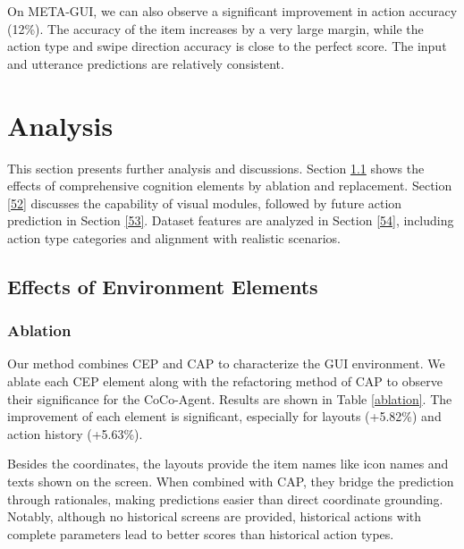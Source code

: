 On META-GUI, we can also observe a significant improvement in action accuracy (12\%).
The accuracy of the item increases by a very large margin, while the action type and swipe direction accuracy is close to the perfect score. The input and utterance predictions are relatively consistent.

\section{Analysis}
This section presents further analysis and discussions. Section \ref{51} shows the effects of comprehensive cognition elements by ablation and replacement. Section \ref{52} discusses the capability of visual modules, followed by future action prediction in Section \ref{53}. Dataset features are analyzed in Section \ref{54}, including action type categories and alignment with realistic scenarios.

\subsection{Effects of Environment Elements}
\label{51}
\subsubsection{Ablation}
Our method combines CEP and CAP to characterize the GUI environment.
We ablate each CEP element along with the refactoring method of CAP to observe their significance for the CoCo-Agent.
Results are shown in Table \ref{ablation}. The improvement of each element is significant, especially for layouts (+5.82\%) and action history (+5.63\%). 

Besides the coordinates, the layouts provide the item names like icon names and texts shown on the screen. When combined with CAP, they bridge the prediction through rationales, making predictions easier than direct coordinate grounding.
Notably, although no historical screens are provided, historical actions with complete parameters lead to better scores than historical action types.


